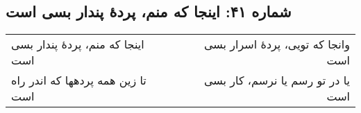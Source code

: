 \begin{center}
\section*{شماره ۴۱: اینجا که منم، پردۀ پندار بسی است}
\label{sec:041}
\begin{longtable}{l p{0.5cm} r}
اینجا که منم، پردهٔ پندار بسی است
&&
وانجا که تویی، پردهٔ اسرار بسی است
\\
تا زین همه پردهها که اندر راه است
&&
یا در تو رسم یا نرسم، کار بسی است
\\
\end{longtable}
\end{center}
